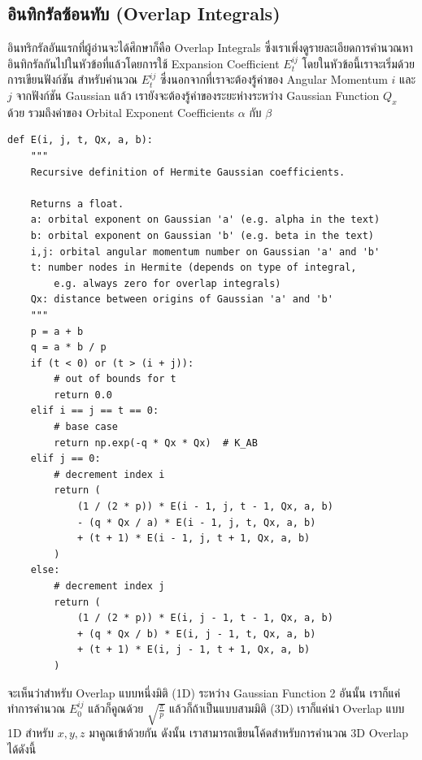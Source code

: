 \subsection{อินทิกรัลซ้อนทับ (Overlap Integrals)}

อินทริกรัลอันแรกที่ผู้อ่านจะได้ศึกษาก็คือ Overlap Integrals ซึ่งเราเพิ่งดูรายละเอียดการคำนวณหาอินทิกรัลกันไปในหัวข้อที่แล้วโดยการใช้
Expansion Coefficient $E_t^{ij}$ โดยในหัวข้อนี้เราจะเริ่มด้วยการเขียนฟังก์ชัน  สำหรับคำนวณ $E_t^{ij}$
ซึ่งนอกจากที่เราจะต้องรู้ค่าของ Angular Momentum $i$ และ $j$ จากฟังก์ชัน Gaussian แล้ว เรายังจะต้องรู้ค่าของระยะห่างระหว่าง Gaussian
Function $Q_x$ ด้วย รวมถึงค่าของ Orbital Exponent Coefficients $\alpha$ กับ $\beta$

\vspace{5pt}

\begin{lstlisting}[style=MyPython]
def E(i, j, t, Qx, a, b):
    """
    Recursive definition of Hermite Gaussian coefficients.

    Returns a float.
    a: orbital exponent on Gaussian 'a' (e.g. alpha in the text)
    b: orbital exponent on Gaussian 'b' (e.g. beta in the text)
    i,j: orbital angular momentum number on Gaussian 'a' and 'b'
    t: number nodes in Hermite (depends on type of integral,
        e.g. always zero for overlap integrals)
    Qx: distance between origins of Gaussian 'a' and 'b'
    """
    p = a + b
    q = a * b / p
    if (t < 0) or (t > (i + j)):
        # out of bounds for t
        return 0.0
    elif i == j == t == 0:
        # base case
        return np.exp(-q * Qx * Qx)  # K_AB
    elif j == 0:
        # decrement index i
        return (
            (1 / (2 * p)) * E(i - 1, j, t - 1, Qx, a, b)
            - (q * Qx / a) * E(i - 1, j, t, Qx, a, b)
            + (t + 1) * E(i - 1, j, t + 1, Qx, a, b)
        )
    else:
        # decrement index j
        return (
            (1 / (2 * p)) * E(i, j - 1, t - 1, Qx, a, b)
            + (q * Qx / b) * E(i, j - 1, t, Qx, a, b)
            + (t + 1) * E(i, j - 1, t + 1, Qx, a, b)
        )
\end{lstlisting}

\vspace{5pt}

จะเห็นว่าสำหรับ Overlap แบบหนึ่งมิติ (1D) ระหว่าง Gaussian Function 2 อันนั้น เราก็แค่ทำการคำนวณ $E_0^{ij}$ แล้วก็คูณด้วย
$\sqrt{\frac{\pi}{p}}$ แล้วก็ถ้าเป็นแบบสามมิติ (3D) เราก็แค่นำ Overlap แบบ 1D สำหรับ $x,y,z$ มาคูณเข้าด้วยกัน
ดังนั้น เราสามารถเขียนโค้ดสำหรับการคำนวณ 3D Overlap ได้ดังนี้

